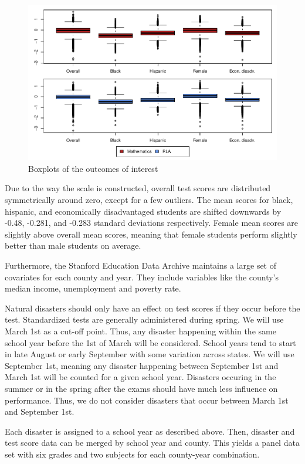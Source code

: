 \begin{figure}[!h]
	\centering
	\includegraphics[scale=1]{"../Code & Data/DepVarsBoxplot.pdf"}
	\caption{Boxplots of the outcomes of interest}
	\label{DepVarsBoxplot}
\end{figure}

Due to the way the scale is constructed, overall test scores are distributed symmetrically around zero, except for a few outliers. The mean scores for black, hispanic, and economically disadvantaged students are shifted downwards by -0.48, -0.281, and -0.283 standard deviations respectively. Female mean scores are slightly above overall mean scores, meaning that female students perform slightly better than male students on average.

Furthermore, the Stanford Education Data Archive maintains a large set of covariates for each county and year. They include variables like the county's median income, unemployment and poverty rate.

Natural disasters should only have an effect on test scores if they occur before the test. Standardized tests are generally administered during spring. We will use March 1st as a cut-off point. Thus, any disaster happening within the same school year before the 1st of March will be considered. School years tend to start in late August or early September with some variation across states. We will use September 1st, meaning any disaster happening between September 1st and March 1st will be counted for a given school year. Disasters occuring in the summer or in the spring after the exams should have much less influence on performance. Thus, we do not consider disasters that occur between March 1st and September 1st.

Each disaster is assigned to a school year as described above. Then, disaster and test score data can be merged by school year and county. This yields a panel data set with six grades and two subjects for each county-year combination.

